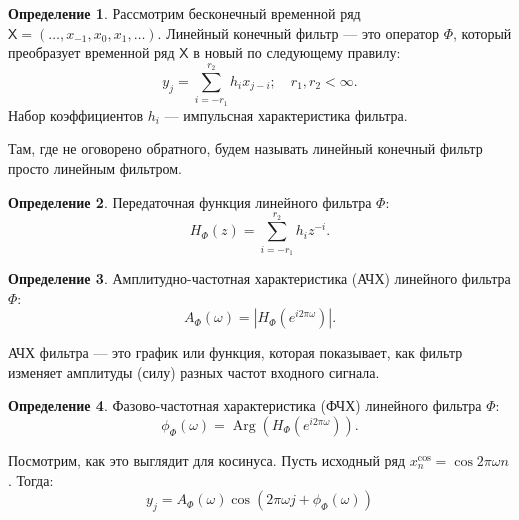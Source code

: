 \documentclass[12pt, specialist, subf
]{disser}
\theoremstyle{definition}
\newcommand{\TS}{\mathsf{X}}
\newtheorem{definition}{Определение} %
\begin{document}
\begin{definition}
	Рассмотрим бесконечный временной ряд $\TS = (\dots, x_{-1}, x_0, x_1, \dots)$. Линейный конечный фильтр --- это оператор $\Phi$, который преобразует временной ряд $\TS$ в новый по следующему правилу:
	\begin{equation*}
		y_j = \sum \limits_{i = -r_1}^{r_2} h_i x_{j-i}; \quad r_1, r_2 < \infty.
	\end{equation*}
	Набор коэффициентов ${h_i}$ --- импульсная характеристика фильтра.
\end{definition}

Там, где не оговорено обратного, будем называть линейный конечный фильтр просто линейным фильтром.

\begin{definition}
	Передаточная функция линейного фильтра $\Phi$:
	\begin{equation*}
		H_{\Phi}(z) = \sum \limits_{i = -r_1}^{r_2} h_i z^{-i}.
	\end{equation*}
\end{definition}

\begin{definition}
	Амплитудно-частотная характеристика (АЧХ) линейного фильтра $\Phi$:
	\begin{equation*}
		A_{\Phi}(\omega) = \left| H_{\Phi}\left(e^{i2\pi\omega}\right) \right|.
	\end{equation*}
\end{definition}

АЧХ фильтра  — это график или функция, которая показывает, как фильтр изменяет амплитуды (силу) разных частот входного сигнала.

\begin{definition}
	Фазово-частотная характеристика (ФЧХ) линейного фильтра $\Phi$:
	\begin{equation*}
		\phi_{\Phi}(\omega) = \operatorname{Arg}\left(H_{\Phi}\left(e^{i2\pi\omega}\right)\right).
	\end{equation*}
\end{definition}

Посмотрим, как это выглядит для косинуса. Пусть исходный ряд $x_n^{\cos} = \cos{2\pi \omega n}$. Тогда:
\begin{equation*}
	y_j = A_{\Phi}(\omega) \cos\left(2\pi\omega j + \phi_{\Phi}(\omega) \right)
\end{equation*}
\end{document}
